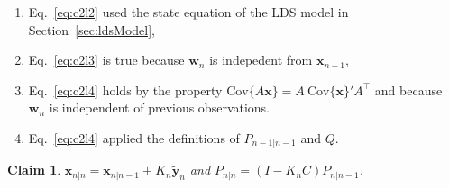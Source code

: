 \documentclass[12pt]{article}
\newtheorem{claim}{Claim}
\begin{document}
\begin{enumerate}
    \item Eq.~\ref{eq:c2l2} used the state equation of the LDS model in
        Section~\ref{sec:ldsModel},
    \item Eq.~\ref{eq:c2l3} is true because $\mathbf{w}_n$ is indepedent from
        $\mathbf{x}_{n-1}$,
    \item Eq.~\ref{eq:c2l4} holds by the property
        $\text{Cov}\{A\mathbf{x}\}=A\ \text{Cov}\{\mathbf{x}\}' A^\intercal$ and
        because $\mathbf{w}_n$ is independent of previous observations.
    \item Eq.~\ref{eq:c2l4} applied the definitions of $P_{n-1|n-1}$ and $Q$.
\end{enumerate}

\begin{claim}
    $\mathbf{x}_{n|n}=\mathbf{x}_{n|n-1}+K_n\tilde{\mathbf{y}}_n$ and
    $P_{n|n}=(I-K_nC)P_{n|n-1}$.
    \label{claim:filteringMeanAndCov}
\end{claim}
\end{document}
